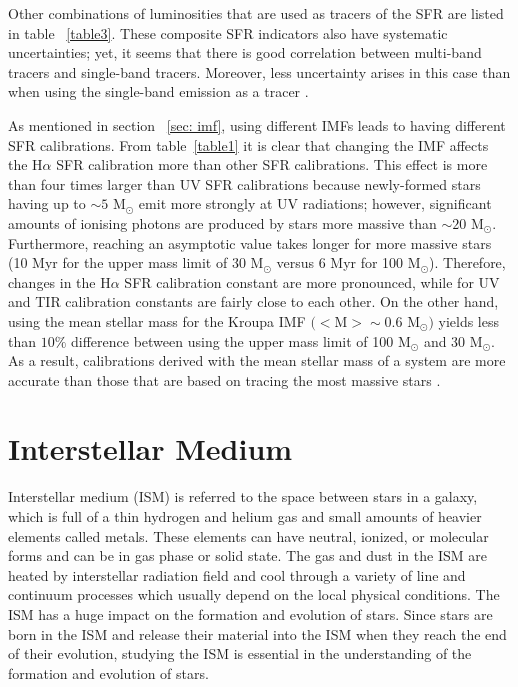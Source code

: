 Other combinations of luminosities that are used as tracers of the SFR are listed in table ~\ref{table3}. These composite SFR indicators also have systematic uncertainties; yet, it seems that there is good correlation between multi-band tracers and single-band tracers. Moreover, less uncertainty arises in this case than when using the single-band emission as a tracer \citep{Kennicutt09}. 

As mentioned in section ~\ref{sec: imf}, using different IMFs leads to having different SFR calibrations. From table~\ref{table1} it is clear that changing the IMF affects the H${\alpha}$ SFR calibration more than other SFR calibrations. This effect is more than four times larger than UV SFR calibrations because newly-formed stars having up to $\sim 5$ M$_{\odot}$ emit more strongly at UV radiations; however, significant amounts of ionising photons are produced by stars more massive than $\sim 20$ M$_{\odot}$. Furthermore, reaching an asymptotic value takes longer for more massive stars (10 Myr for the upper mass limit of 30 M$_{\odot}$ versus 6 Myr for 100 M$_{\odot}$). Therefore, changes in the H${\alpha}$ SFR calibration constant are more pronounced, while for UV and TIR calibration constants are fairly close to each other. On the other hand, using the mean stellar mass for the Kroupa IMF $(<$M$> \sim 0.6$ M$_{\odot})$ yields less than $10\%$ difference between using the upper mass limit of 100 M$_{\odot}$ and 30 M$_{\odot}$. As a result, calibrations derived with the mean stellar mass of a system are more accurate than those that are based on tracing the most massive stars \citep{Calzetti13}.
 

\section{Interstellar Medium}
\label{chap:ism}

Interstellar medium (ISM) is referred to the space between stars in a galaxy, which is full of a thin hydrogen and helium gas and small amounts of heavier elements called metals. These elements can have neutral, ionized, or molecular forms and can be in gas phase or solid state. The gas and dust in the ISM are heated by interstellar radiation field and cool through a variety of line and continuum processes which usually depend on the local physical conditions. The ISM has a huge impact on the formation and evolution of stars. Since stars are born in the ISM and release their material into the ISM when they reach the end of their evolution, studying the ISM is essential in the understanding of the formation and evolution of stars.

